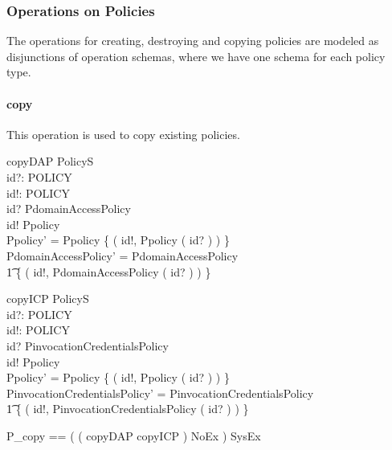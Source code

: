 \subsubsection{Operations on Policies} \label{sec:policyOps}
The operations for creating, destroying and copying policies are modeled as
disjunctions of operation schemas, where we have one schema for each policy
type.

\paragraph{copy}
This operation is used to copy existing policies.  
\begin{schema}{copyDAP}
  \Delta PolicyS \\
  id?: POLICY \\
  id!: POLICY \\
  \where
  id? \in \dom PdomainAccessPolicy \\
  id! \notin \dom Ppolicy \\

  Ppolicy' = Ppolicy \cup \{ ( id!, Ppolicy ( id? ) ) \} \\

  PdomainAccessPolicy' = PdomainAccessPolicy \cup \\
  \t1 \{ ( id!, PdomainAccessPolicy ( id? ) ) \} \\ 
\end{schema}
\begin{schema}{copyICP}
  \Delta PolicyS \\
  id?: POLICY \\
  id!: POLICY \\
  \where
  id? \in \dom PinvocationCredentialsPolicy \\
  id! \notin \dom Ppolicy \\

  Ppolicy' = Ppolicy \cup \{ ( id!, Ppolicy ( id? ) ) \} \\

  PinvocationCredentialsPolicy' = PinvocationCredentialsPolicy \cup \\
  \t1 \{ ( id!, PinvocationCredentialsPolicy ( id? ) ) \} \\
\end{schema}
\begin{zed}
  P\_copy  == ( ( copyDAP \lor copyICP ) \land NoEx ) \lor SysEx \\
\end{zed}


